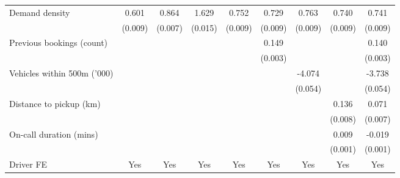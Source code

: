 \documentclass[reviewmode]{restud}
\begin{document}
\begin{landscape}
\begin{table}
{\begin{tabular}{l*{8}{S}}
				Demand density      &       0.601&       0.864&       1.629&       0.752&       0.729&       0.763&       0.740&       0.741\\
				                    &     (0.009)         &     (0.007)         &     (0.015)         &     (0.009)         &     (0.009)         &     (0.009)         &     (0.009)         &     (0.009)         \\
				\addlinespace
				Previous bookings (count)&                     &                     &                     &                     &       0.149&                     &                     &       0.140\\
				                    &                     &                     &                     &                     &     (0.003)         &                     &                     &     (0.003)         \\
				\addlinespace
				Vehicles within 500m ('000)&                     &                     &                     &                     &                     &      -4.074&                     &      -3.738\\
				                    &                     &                     &                     &                     &                     &     (0.054)         &                     &     (0.054)         \\
				\addlinespace
				Distance to pickup (km)&                     &                     &                     &                     &                     &                     &       0.136&       0.071\\
				                    &                     &                     &                     &                     &                     &                     &     (0.008)         &     (0.007)         \\
				\addlinespace
				On-call duration (mins)&                     &                     &                     &                     &                     &                     &       0.009&      -0.019\\
				                    &                     &                     &                     &                     &                     &                     &     (0.001)         &     (0.001)         \\
				\addlinespace
				Driver FE           &       {Yes}         &       {Yes}         &       {Yes}         &       {Yes}         &       {Yes}         &       {Yes}         &       {Yes}         &       {Yes}         \\

\end{tabular}}
\end{table}
\end{landscape}
\end{document}
